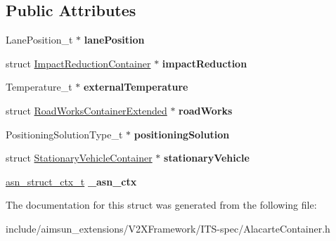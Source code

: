 \subsection*{Public Attributes}
\begin{DoxyCompactItemize}
\item 
Lane\+Position\+\_\+t $\ast$ {\bfseries lane\+Position}\hypertarget{structAlacarteContainer_a820edd74451c678025808bff7c0e4d94}{}\label{structAlacarteContainer_a820edd74451c678025808bff7c0e4d94}

\item 
struct \hyperlink{structImpactReductionContainer}{Impact\+Reduction\+Container} $\ast$ {\bfseries impact\+Reduction}\hypertarget{structAlacarteContainer_aacb6e16622cf6a816ac9ed7bbd918fb4}{}\label{structAlacarteContainer_aacb6e16622cf6a816ac9ed7bbd918fb4}

\item 
Temperature\+\_\+t $\ast$ {\bfseries external\+Temperature}\hypertarget{structAlacarteContainer_ac653912d88f21766d79e87c961e816ca}{}\label{structAlacarteContainer_ac653912d88f21766d79e87c961e816ca}

\item 
struct \hyperlink{structRoadWorksContainerExtended}{Road\+Works\+Container\+Extended} $\ast$ {\bfseries road\+Works}\hypertarget{structAlacarteContainer_a3bf992f0424241519afc7b50638dc49b}{}\label{structAlacarteContainer_a3bf992f0424241519afc7b50638dc49b}

\item 
Positioning\+Solution\+Type\+\_\+t $\ast$ {\bfseries positioning\+Solution}\hypertarget{structAlacarteContainer_a6b14a10ec9d60bb2332f3f9bbee7ee76}{}\label{structAlacarteContainer_a6b14a10ec9d60bb2332f3f9bbee7ee76}

\item 
struct \hyperlink{structStationaryVehicleContainer}{Stationary\+Vehicle\+Container} $\ast$ {\bfseries stationary\+Vehicle}\hypertarget{structAlacarteContainer_abb3372826028718a5cebf71479af42a3}{}\label{structAlacarteContainer_abb3372826028718a5cebf71479af42a3}

\item 
\hyperlink{structasn__struct__ctx__s}{asn\+\_\+struct\+\_\+ctx\+\_\+t} {\bfseries \+\_\+asn\+\_\+ctx}\hypertarget{structAlacarteContainer_a983c4f09c51a878c0c6de982fc54b7db}{}\label{structAlacarteContainer_a983c4f09c51a878c0c6de982fc54b7db}

\end{DoxyCompactItemize}


The documentation for this struct was generated from the following file\+:\begin{DoxyCompactItemize}
\item 
include/aimsun\+\_\+extensions/\+V2\+X\+Framework/\+I\+T\+S-\/spec/Alacarte\+Container.\+h\end{DoxyCompactItemize}
